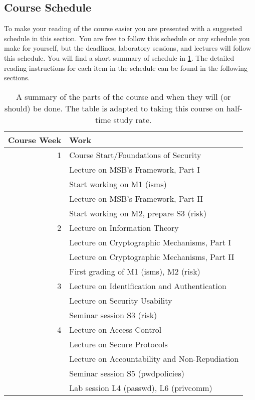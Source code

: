 \documentclass[a4paper]{llncs}
\begin{document}
\subsection{Course Schedule}
\label{sec:schedule}
To make your reading of the course easier you are presented with a suggested 
schedule in this section.
You are free to follow this schedule or any schedule you make for yourself, but 
the deadlines, laboratory sessions, and lectures will follow this schedule.
You will find a short summary of schedule in \cref{Schedule}.
The detailed reading instructions for each item in the schedule can be found in 
the following sections.

\begin{table}
	\centering
  \caption{%
    A summary of the parts of the course and when they will (or should) be 
    done.
    The table is adapted to taking this course on half-time study rate.
  }\label{Schedule}
  \begin{tabular}{rp{9cm}}
    \textbf{Course Week}	& \textbf{Work} \\
    \toprule
    1
      & Course Start/Foundations of Security\\
      & Lecture on MSB's Framework, Part I\\
      & Start working on M1 (isms)\\
      & Lecture on MSB's Framework, Part II\\
      & Start working on M2, prepare S3 (risk)\\
    \midrule
    2
      & Lecture on Information Theory\\
      & Lecture on Cryptographic Mechanisms, Part I\\
      & Lecture on Cryptographic Mechanisms, Part II\\
      & First grading of M1 (isms), M2 (risk)\\
    \midrule
    3
      & Lecture on Identification and Authentication\\
      & Lecture on Security Usability\\
      & Seminar session S3 (risk)\\
    \midrule
    4
      & Lecture on Access Control\\
      & Lecture on Secure Protocols\\
      & Lecture on Accountability and Non-Repudiation\\
      & Seminar session S5 (pwdpolicies)\\
      & Lab session L4 (passwd), L6 (privcomm)\\

\end{tabular}
\end{table}
\end{document}
